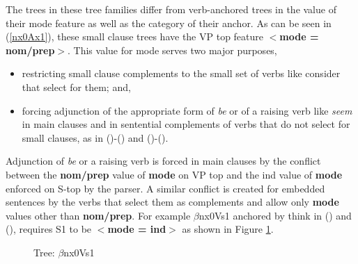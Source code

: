 The trees in these tree families differ from verb-anchored trees in
the value of their mode feature as well as the category of their
anchor. As can be seen in (\ref{nx0Ax1}), these small clause trees have
the VP top feature {\bf $<$mode = nom/prep$>$}.  This value for mode serves two
major purposes, 
\begin{itemize}
\item restricting small clause complements to the
small set of verbs like consider that select for them; and, 
\item forcing adjunction of the
appropriate form of {\it be\/} or of a raising verb like {\it seem\/}  in main
clauses and in sentential complements of verbs that do not select for small
clauses, as in ()-() and  ()-().
\end{itemize}


Adjunction of {\it be\/}  or a raising verb is forced in main clauses by
the conflict between the {\bf nom/prep} value of {\bf mode} on VP top and the ind
value of {\bf mode} enforced on S-top by the parser.  A similar conflict is
created for embedded sentences by the verbs that select them as
complements and allow only {\bf mode} values other than {\bf nom/prep}.  For
example $\beta$nx0Vs1 anchored by think in () and (),
requires S1 to be {\bf $<$mode = ind$>$} as shown in Figure \ref{nx0Vs1}.

\begin{figure}[ht]
\centering
{}
\caption{\label{nx0Vs1} Tree:  $\beta$nx0Vs1}
\end{figure}
